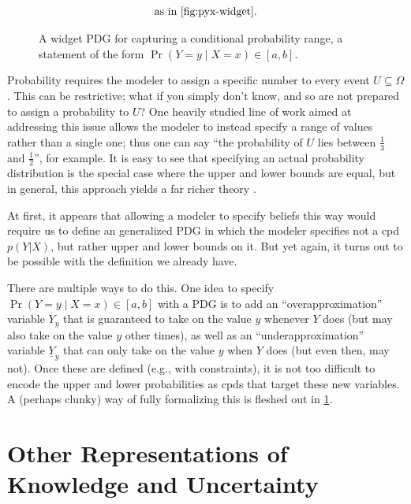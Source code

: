 \begin{figure}
\begin{align*}
            \text{as in \cref{fig:pyx-widget}.}
        \end{align*}
    \caption{A widget PDG for capturing a conditional probability range, a statement of the form $\Pr(Y{=}y\mid X{=}x) \in [a,b]$.}
    \label{fig:pyx-range-widget}
\end{figure}

Probability requires the modeler to assign a specific number to every event $U \subseteq \Omega$. This can be restrictive; what if you simply don't know, and so are not prepared to assign a probability to $U$? 
One heavily studied line of work aimed at addressing this issue allows the modeler to instead specify a range of values rather than a single one; thus one can say ``the probability of $U$ lies between $\frac13$ and $\frac12$'', for example.
It is easy to see that specifying an actual probability distribution is the special case where the upper and lower bounds are equal, but in general, this approach yields a far richer theory \cite{Walley1991-SRIP}.

At first, it appears that allowing a modeler to specify beliefs this way would require us to define an generalized PDG in which the modeler specifies not a cpd $p(Y|X)$, but rather upper and lower bounds on it. But yet again, it turns out to be possible with the definition we already have.

There are multiple ways to do this. One idea to specify $\Pr(Y{=}y\mid X{=}x) \in [a,b]$ with a PDG is to add an ``overapproximation'' variable $\overline Y_y$ that is guaranteed to take on the value $y$ whenever $Y$ does (but may also take on the value $y$ other times), as well as an ``underapproximation'' variable $\underline Y_y$ that can only take on the value $y$ when $Y$ does (but even then, may not). 
Once these are defined (e.g., with constraints), it is not too difficult to encode the upper and lower probabilities as cpds that target these new variables. 
A (perhaps clunky) way of fully formalizing this is fleshed out in \cref{fig:pyx-range-widget}.

\section{Other Representations of Knowledge and Uncertainty}

